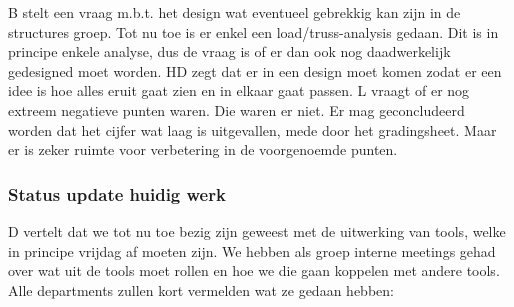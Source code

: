\newline\newline
B stelt een vraag m.b.t. het design wat eventueel gebrekkig kan zijn in de structures groep. Tot nu toe is er enkel een load/truss-analysis gedaan. Dit is in principe enkele analyse, dus de vraag is of er dan ook nog daadwerkelijk gedesigned moet worden. HD zegt dat er in een design moet komen zodat er een idee is hoe alles eruit gaat zien en in elkaar gaat passen. L vraagt of er nog extreem negatieve punten waren. Die waren er niet. Er mag geconcludeerd worden dat het cijfer wat laag is uitgevallen, mede door het gradingsheet. Maar er is zeker ruimte voor verbetering in de voorgenoemde punten.


\subsubsection{Status update huidig werk}
D vertelt dat we tot nu toe bezig zijn geweest met de uitwerking van tools, welke in principe vrijdag af moeten zijn. We hebben als groep interne meetings gehad over wat uit de tools moet rollen en hoe we die gaan koppelen met andere tools. Alle departments zullen kort vermelden wat ze gedaan hebben:

